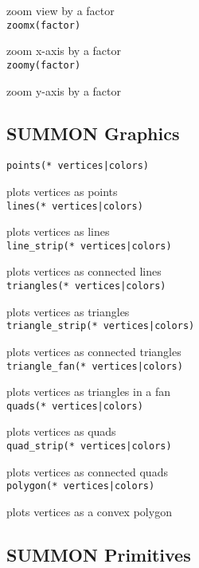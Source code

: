 zoom view by a factor \\


{\tt zoomx(factor) }

zoom x-axis by a factor \\


{\tt zoomy(factor) }

zoom y-axis by a factor \\


\subsection{SUMMON Graphics}

{\tt points(* vertices|colors) }

plots vertices as points \\


{\tt lines(* vertices|colors) }

plots vertices as lines \\


{\tt line\_strip(* vertices|colors) }

plots vertices as connected lines \\


{\tt triangles(* vertices|colors) }

plots vertices as triangles \\


{\tt triangle\_strip(* vertices|colors) }

plots vertices as connected triangles \\


{\tt triangle\_fan(* vertices|colors) }

plots vertices as triangles in a fan \\


{\tt quads(* vertices|colors) }

plots vertices as quads \\


{\tt quad\_strip(* vertices|colors) }

plots vertices as connected quads \\


{\tt polygon(* vertices|colors) }

plots vertices as a convex polygon \\


\subsection{SUMMON Primitives}


